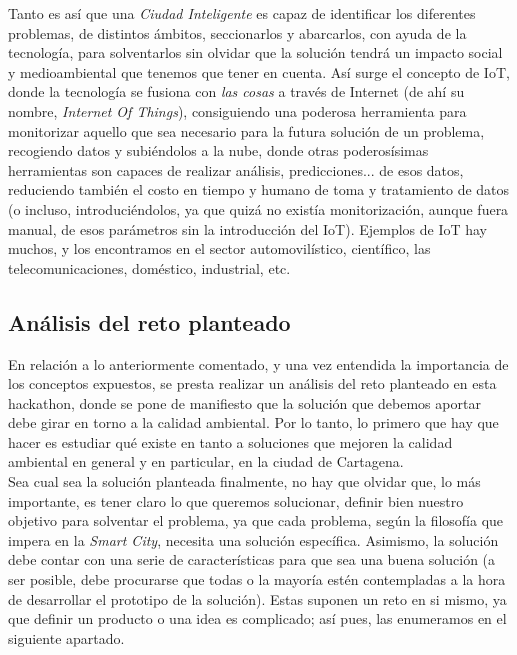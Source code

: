 \documentclass[12pt]{article}
\begin{document}
	\noindent	Tanto es así que una \textit{Ciudad Inteligente} es capaz de identificar los diferentes problemas, de distintos ámbitos, seccionarlos y abarcarlos, con ayuda de la tecnología, para solventarlos sin olvidar que la solución tendrá un impacto social y medioambiental que tenemos que tener en cuenta. Así surge el concepto de IoT, donde la tecnología se fusiona con \textit{las cosas} a través de Internet (de ahí su nombre, \textit{Internet Of Things}), consiguiendo una poderosa herramienta para monitorizar aquello que sea necesario para la futura solución de un problema, recogiendo datos y subiéndolos a la nube, donde otras poderosísimas herramientas son capaces de realizar análisis, predicciones... de esos datos, reduciendo también el costo en tiempo y humano de toma y tratamiento de datos (o incluso, introduciéndolos, ya que quizá no existía monitorización, aunque fuera manual, de esos parámetros sin la introducción del IoT). Ejemplos de IoT hay muchos, y los encontramos en el sector automovilístico, científico, las telecomunicaciones, doméstico, industrial, etc. 
	
	\subsection{Análisis del reto planteado}
	
	En relación a lo anteriormente comentado, y una vez entendida la importancia de los conceptos expuestos, se presta realizar un análisis del reto planteado en esta hackathon, donde se pone de manifiesto que la solución que debemos aportar debe girar en torno a la calidad ambiental. Por lo tanto, lo primero que hay que hacer es estudiar qué existe en tanto a soluciones que mejoren la calidad ambiental en general y en particular, en la ciudad de Cartagena. \\
	
	\noindent	Sea cual sea la solución planteada finalmente, no hay que olvidar que, lo más importante, es tener claro lo que queremos solucionar, definir bien nuestro objetivo para solventar el problema, ya que cada problema, según la filosofía que impera en la \textit{Smart City}, necesita una solución específica. Asimismo, la solución debe contar con una serie de características para que sea una buena solución (a ser posible, debe procurarse que todas o la mayoría estén contempladas a la hora de desarrollar el prototipo de la solución). Estas suponen un reto en si mismo, ya que definir un producto o una idea es complicado; así pues, las enumeramos en el siguiente apartado.
	
\end{document}
